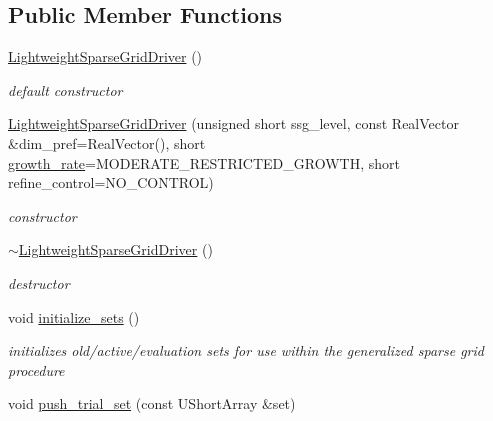 \subsection*{Public Member Functions}
\begin{DoxyCompactItemize}
\item 
\hyperlink{classPecos_1_1LightweightSparseGridDriver_a258a4f02a1442f1580ae51823b28e7b9}{Lightweight\+Sparse\+Grid\+Driver} ()\label{classPecos_1_1LightweightSparseGridDriver_a258a4f02a1442f1580ae51823b28e7b9}

\begin{DoxyCompactList}\small\item\em default constructor \end{DoxyCompactList}\item 
\hyperlink{classPecos_1_1LightweightSparseGridDriver_aeb28d870b34f91c2e9b935d68466b731}{Lightweight\+Sparse\+Grid\+Driver} (unsigned short ssg\+\_\+level, const Real\+Vector \&dim\+\_\+pref=Real\+Vector(), short \hyperlink{classPecos_1_1SparseGridDriver_a6f9061513ba25c62ee7a49b0d5da42cc}{growth\+\_\+rate}=M\+O\+D\+E\+R\+A\+T\+E\+\_\+\+R\+E\+S\+T\+R\+I\+C\+T\+E\+D\+\_\+\+G\+R\+O\+W\+TH, short refine\+\_\+control=N\+O\+\_\+\+C\+O\+N\+T\+R\+OL)\label{classPecos_1_1LightweightSparseGridDriver_aeb28d870b34f91c2e9b935d68466b731}

\begin{DoxyCompactList}\small\item\em constructor \end{DoxyCompactList}\item 
\hyperlink{classPecos_1_1LightweightSparseGridDriver_a27a8fed45f7f78fdbdbbb2c041de7b4c}{$\sim$\+Lightweight\+Sparse\+Grid\+Driver} ()\label{classPecos_1_1LightweightSparseGridDriver_a27a8fed45f7f78fdbdbbb2c041de7b4c}

\begin{DoxyCompactList}\small\item\em destructor \end{DoxyCompactList}\item 
void \hyperlink{classPecos_1_1LightweightSparseGridDriver_a059e9e1e03a5cd29771d369b76311261}{initialize\+\_\+sets} ()
\begin{DoxyCompactList}\small\item\em initializes old/active/evaluation sets for use within the generalized sparse grid procedure \end{DoxyCompactList}\item 
void \hyperlink{classPecos_1_1LightweightSparseGridDriver_a99c17efb3a8e873b7708652cc1787370}{push\+\_\+trial\+\_\+set} (const U\+Short\+Array \&set)\label{classPecos_1_1LightweightSparseGridDriver_a99c17efb3a8e873b7708652cc1787370}


\end{DoxyCompactItemize}
